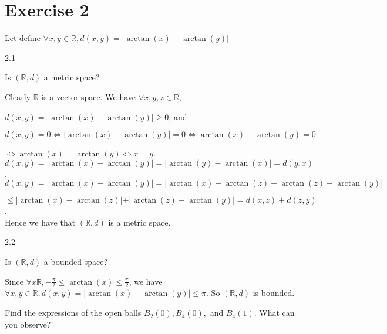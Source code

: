 \documentclass[12pt,a4paper]{article}
\begin{document}
\vspace{5 mm}
\section*{Exercise 2}
\begin{ques}
	Let define $\forall x,y \in \mathbb{R}, d(x,y) = \vert \arctan(x) - \arctan(y) \vert$
\end{ques}

2.1
\begin{ques}
	Is $(\mathbb{R},d)$ a metric space?
\end{ques}
	
	Clearly $\mathbb{R}$ is a vector space. We have $\forall x,y,z \in \mathbb{R}$,
	
	$d(x,y) = \vert \arctan(x) - \arctan(y) \vert \ge 0$, and
	
	$d(x,y) = 0 \Longleftrightarrow \vert \arctan(x) - \arctan(y) \vert = 0 \Longleftrightarrow \arctan(x) - \arctan(y) = 0$
	
	\hspace{20.5 mm}$\Longleftrightarrow \arctan(x) = \arctan(y) \Longleftrightarrow x = y$.\\
	
	$d(x,y) = \vert \arctan(x) - \arctan(y) \vert = \vert \arctan(y) - \arctan(x) \vert = d(y,x)$.\\
	
	$d(x,y) = \vert \arctan(x) - \arctan(y) \vert = \vert \arctan(x) - \arctan(z) + \arctan(z) - \arctan(y) \vert$
	
	\hspace{11.5 mm} $\leq \vert \arctan(x) - \arctan(z) \vert + \vert \arctan(z) - \arctan(y) \vert = d(x,z) + d(z,y)$.\\
	
	Hence we have that $(\mathbb{R},d)$ is a metric space.
	
\vspace{5 mm}	
2.2
\begin{ques}
	Is $(\mathbb{R},d)$ a bounded space?
\end{ques}
	
	Since $\forall x \mathbb{R}, -\frac{\pi}{2} \leq \arctan(x) \leq \frac{\pi}{2}$, we have $\forall x,y \in \mathbb{R}, d(x,y) = \vert \arctan(x) - \arctan(y) \vert \leq \pi$. So $(\mathbb{R},d)$ is bounded.
	
\begin{ques}
	Find the expressions of the open balls $B_2(0), B_4(0),$ and $B_4(1)$. What can you observe?
\end{ques}
	
\end{document}
